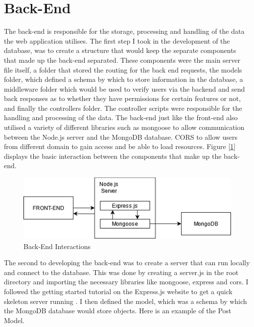 \section{Back-End}
The back-end is responsible for the storage, processing and handling of the data the web application utilises. The first step I took in the development of the database, was to create a structure that would keep the separate components that made up the back-end separated. These components were the main server file itself, a folder that stored the routing for the back end requests, the models folder, which defined a schema by which to store information in the database, a middleware folder which would be used to verify users via the backend and send back responses as to whether they have permissions for certain features or not, and finally the controllers folder. The controller scripts were responsible for the handling and processing of the data. The back-end just like the front-end also utilised a variety of different libraries such as mongoose to allow communication between the Node.js server and the MongoDB database. CORS to allow users from different domain to gain access and be able to load resources. Figure [\ref{fig7:backend}] displays the basic interaction between the components that make up the back-end.
\begin{figure}
    \centering
    \includegraphics[scale=0.7]{img/back-end.png}
    \caption{Back-End Interactions}
    \label{fig7:backend}
\end{figure}
The second to developing the back-end was to create a server that can run locally and connect to the database. This was done by creating a server.js in the root directory and importing the necessary libraries like mongoose, express and cors. I followed the getting started tutorial on the Express.js website to get a quick skeleton server running \cite{express}. I then defined the model, which was a schema by which the MongoDB database would store objects. Here is an example of the Post Model.


